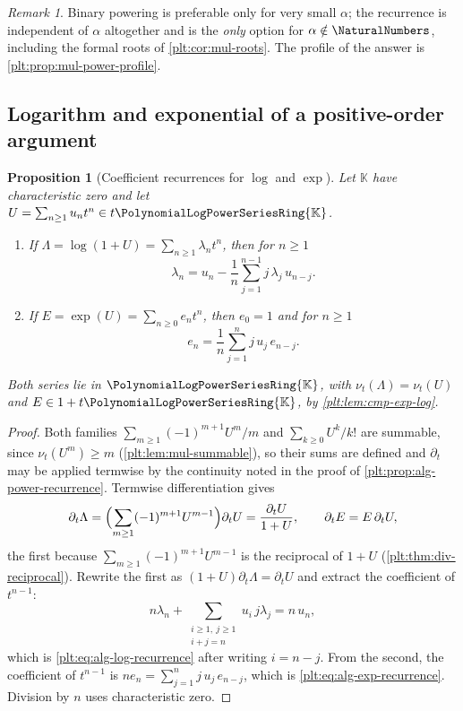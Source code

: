 \documentclass[11pt,oneside]{article}
\theoremstyle{plain}
\newtheorem{proposition}[theorem]{Proposition}
\theoremstyle{definition}
\theoremstyle{remark}
\newtheorem{remark}[theorem]{Remark}
\newcommand{\K}{\mathbb{K}}
\newcommand{\PLpow}{\PolynomialLogPowerSeriesRing{\K}}   %
\newcommand{\ordt}{\nu_{t}}                              %
\begin{document}
\begin{remark}
Binary powering is preferable only for very small \(\alpha\); the recurrence is
independent of \(\alpha\) altogether and is the \emph{only} option for
\(\alpha\notin\NaturalNumbers\), including the formal roots of
\cref{plt:cor:mul-roots}.  The profile of the answer is
\cref{plt:prop:mul-power-profile}.
\end{remark}

\subsection{Logarithm and exponential of a positive-order argument}
\label{plt:sec:alg-explog}

\begin{proposition}[Coefficient recurrences for \(\log\) and \(\exp\)]
\label{plt:prop:alg-explog-recurrences}
Let \(\K\) have characteristic zero and let
\(U=\sum_{n\ge1}u_nt^n\in t\PLpow\).
\begin{enumerate}
\item If \(\Lambda=\log(1+U)=\sum_{n\ge1}\lambda_nt^n\), then for \(n\ge1\)
\begin{equation}\label{plt:eq:alg-log-recurrence}
 \lambda_n=u_n-\frac1n\sum_{j=1}^{n-1}j\,\lambda_j\,u_{n-j}.
\end{equation}
\item If \(E=\exp(U)=\sum_{n\ge0}e_nt^n\), then \(e_0=1\) and for \(n\ge1\)
\begin{equation}\label{plt:eq:alg-exp-recurrence}
 e_n=\frac1n\sum_{j=1}^{n}j\,u_j\,e_{n-j}.
\end{equation}
\end{enumerate}
Both series lie in \(\PLpow\), with \(\ordt(\Lambda)=\ordt(U)\) and
\(E\in1+t\PLpow\), by \cref{plt:lem:cmp-exp-log}.
\end{proposition}

\begin{proof}
Both families \(\sum_{m\ge1}(-1)^{m+1}U^m/m\) and \(\sum_{k\ge0}U^k/k!\) are
summable, since \(\ordt(U^m)\ge m\) (\cref{plt:lem:mul-summable}), so their sums
are defined and \(\partial_t\) may be applied termwise by the continuity noted
in the proof of \cref{plt:prop:alg-power-recurrence}.  Termwise differentiation
gives
\[
 \partial_t\Lambda=\Bigl(\sum_{m\ge1}(-1)^{m+1}U^{m-1}\Bigr)\partial_tU
 =\frac{\partial_tU}{1+U},
 \qquad
 \partial_tE=E\,\partial_tU,
\]
the first because \(\sum_{m\ge1}(-1)^{m+1}U^{m-1}\) is the reciprocal of
\(1+U\) (\cref{plt:thm:div-reciprocal}).  Rewrite the first as
\((1+U)\partial_t\Lambda=\partial_tU\) and extract the coefficient of
\(t^{n-1}\):
\[
 n\lambda_n+\sum_{\substack{i\ge1,\ j\ge1\\ i+j=n}}u_i\,j\lambda_j
 =n\,u_n,
\]
which is \cref{plt:eq:alg-log-recurrence} after writing \(i=n-j\).  From the
second, the coefficient of \(t^{n-1}\) is
\(ne_n=\sum_{j=1}^{n}j\,u_j\,e_{n-j}\), which is
\cref{plt:eq:alg-exp-recurrence}.  Division by \(n\) uses characteristic zero.
\end{proof}
\end{document}
